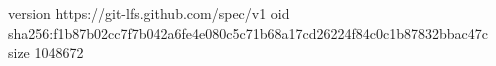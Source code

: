 version https://git-lfs.github.com/spec/v1
oid sha256:f1b87b02cc7f7b042a6fe4e080c5c71b68a17cd26224f84c0c1b87832bbac47c
size 1048672
